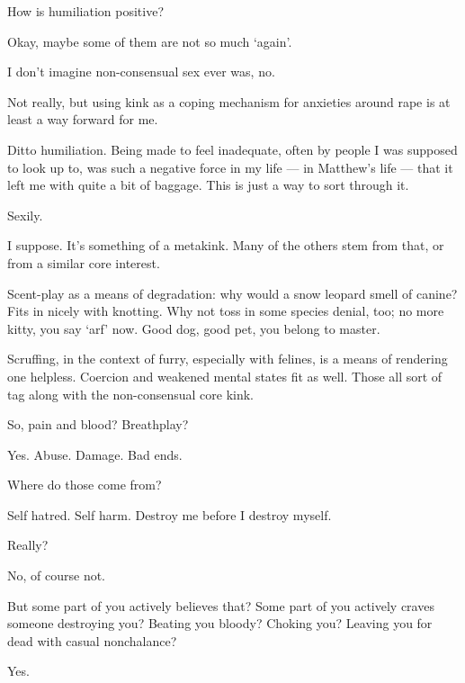 \begin{ally}
How is humiliation positive?
\end{ally}
Okay, maybe some of them are not so much `again'.

\begin{ally}
I don't imagine non-consensual sex ever was, no.
\end{ally}
Not really, but using kink as a coping mechanism for anxieties around rape is at least a way forward for me.

Ditto humiliation. Being made to feel inadequate, often by people I was supposed to look up to, was such a negative force in my life --- in Matthew's life --- that it left me with quite a bit of baggage. This is just a way to sort through it.

\begin{ally}
Sexily.
\end{ally}
I suppose. It's something of a metakink. Many of the others stem from that, or from a similar core interest.

Scent-play as a means of degradation: why would a snow leopard smell of canine? Fits in nicely with knotting. Why not toss in some species denial, too; no more kitty, you say `arf' now. Good dog, good pet, you belong to master.

Scruffing, in the context of furry, especially with felines, is a means of rendering one helpless. Coercion and weakened mental states fit as well. Those all sort of tag along with the non-consensual core kink.

\begin{ally}
So, pain and blood? Breathplay?
\end{ally}
Yes. Abuse. Damage. Bad ends.

\begin{ally}
Where do those come from?
\end{ally}
Self hatred. Self harm. Destroy me before I destroy myself.

\begin{ally}
Really?
\end{ally}
No, of course not.

\begin{ally}
But some part of you actively believes that? Some part of you actively craves someone destroying you? Beating you bloody? Choking you? Leaving you for dead with casual nonchalance?
\end{ally}
Yes.
\newpage

